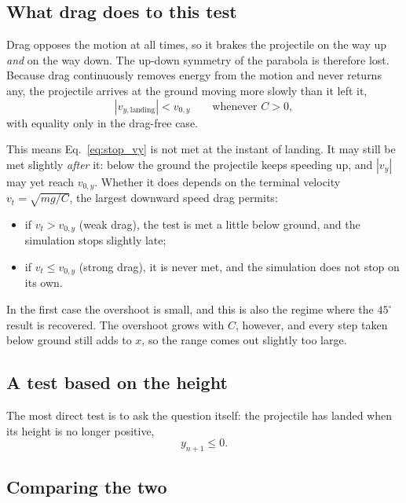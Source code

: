\documentclass[11pt]{article}
\begin{document}
\subsection{What drag does to this test}

Drag opposes the motion at all times, so it brakes the projectile on
the way up \emph{and} on the way down. The up-down symmetry of the
parabola is therefore lost. Because drag continuously removes energy
from the motion and never returns any, the projectile arrives at the
ground moving more slowly than it left it,
\begin{equation}
    |v_{y,\text{landing}}| < v_{0,y}
    \qquad \text{whenever } C > 0 ,
    \label{eq:landing_bound}
\end{equation}
with equality only in the drag-free case.

This means Eq.~\eqref{eq:stop_vy} is not met at the instant of
landing. It may still be met slightly \emph{after} it: below the
ground the projectile keeps speeding up, and $|v_y|$ may yet reach
$v_{0,y}$. Whether it does depends on the terminal velocity
$v_t = \sqrt{mg/C}$, the largest downward speed drag permits:
\begin{itemize}
    \item if $v_t > v_{0,y}$ (weak drag), the test is met a little
    below ground, and the simulation stops slightly late;
    \item if $v_t \leq v_{0,y}$ (strong drag), it is never met, and
    the simulation does not stop on its own.
\end{itemize}
In the first case the overshoot is small, and this is also the regime
where the $45^\circ$ result is recovered. The overshoot grows with
$C$, however, and every step taken below ground still adds to $x$, so
the range comes out slightly too large.

\subsection{A test based on the height}

The most direct test is to ask the question itself: the projectile has
landed when its height is no longer positive,
\begin{equation}
    y_{n+1} \leq 0 .
    \label{eq:stop_y}
\end{equation}

\subsection{Comparing the two}
\end{document}
